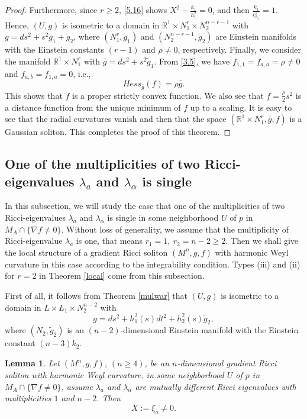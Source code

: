 \documentclass{amsart}
\newtheorem{lemma}[theorem]{Lemma}
\theoremstyle{definition}
\theoremstyle{remark}
\numberwithin{equation}{section}
\begin{document}
\begin{proof}
	 Furthermore, since $r\geq2$, \eqref{5.16} shows $X^2-\frac{k_1}{h^2_1}=0$, and then $\frac{k_1}{c^2_{h_1}}=1$.
	Hence, $(U,g)$ is isometric to a domain in 
	$\mathbb{R}^{1}\times N^{r}_1 \times N^{n-r-1}_2$
	with $g= ds^2 + s^2\tilde{g}_1+\tilde{g}_2 $,
	where $\left(N^{r}_1, \tilde{g}_1\right)$ and $\left(N^{n-r-1}_2, \tilde{g}_2\right)$ 
	are Einstein manifolds with the Einstein constants $(r-1)$ and $\rho\neq 0$, respectively.
	Finally, we consider the manifold $\mathbb{R}^{1}\times N^{r}_1$
	with $\bar{g}=ds^2 + s^2\tilde{g}_1$. From \eqref{3.5}, we have 
	$f_{1,1}=f_{a,a}=\rho\neq0$ and $f_{a,b}=f_{1,a}=0$, i.e.,
	\[
	Hess_{\bar{g}}(f)=\rho\bar{g}.
	\]
	This shows that $f$ is a proper strictly convex function.
	We also see that $f=\frac{\rho}{2}s^2$
	is a distance function from the unique minimum of $f$ up to a scaling. 
	It is easy to see that the radial curvatures vanish and then that
	the space $\left( \mathbb{R}^{1}\times N^{r}_1, \bar{g}, f\right)$ is 
	a Gaussian soliton. 
	This completes the proof of this theorem. 
\end{proof}




	\subsection{One of the multiplicities of two Ricci-eigenvalues $\lambda_a$ and $\lambda_\alpha$ is single}
In this subsection, we will study the case 
that one of the multiplicities of two Ricci-eigenvalues $\lambda_a$ and $\lambda_\alpha$ is single 
 in some neighborhood $U$ of $p$ in $M_A \cap \{ \nabla f \neq 0  \}$.
Without loss of generality, we assume that 
the multiplicity of Ricci-eigenvalue $\lambda_a$ is one, that means $r_1=1,~r_2=n-2\geq2$.
Then we shall give the local structure of a gradient Ricci soliton 
$\left(M^n, g, f \right) $ with harmonic Weyl curvature 
in this case according to the integrability condition.
Types {\rm (iii)} and {\rm (ii)} for $r=2$ in Theorem \ref{local} come from this subsection.

\smallskip
First of all, it follows from Theorem \ref{mulwar} that 
$(U,g)$ is isometric to a domain in 
$ L\times L_1 \times N^{n-2}_2$
with
\[
g= ds^2 + h^2_1(s)dt^2+h^2_2(s) \tilde{g}_{2}, 
\]
where $(N_2, \tilde{g}_{2})$ is an $(n-2)$-dimensional Einstein manifold 
with the Einstein constant $(n-3)k_2$.

\begin{lemma}\label{lemma5.5}
	Let $(M^n, g, f)$, $(n\geq 4)$, be an $n$-dimensional gradient Ricci soliton with harmonic Weyl curvature.
	in some neighborhood $U$ of $p$ in $M_A \cap \{ \nabla f \neq 0  \}$, 
	assume $\lambda_a$ and $\lambda_\alpha$ are mutually different Ricci eigenvalues with multiplicities $1$ and $n-2$.
	 Then 
	 \[
	 X:=\xi_a\neq0.
	 \] 
\end{lemma}
\end{document}
